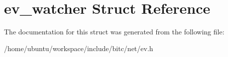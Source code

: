 \hypertarget{structev__watcher}{\section{ev\-\_\-watcher Struct Reference}
\label{structev__watcher}
}


The documentation for this struct was generated from the following file\-:\begin{DoxyCompactItemize}
\item 
/home/ubuntu/workspace/include/bitc/net/ev.\-h\end{DoxyCompactItemize}
